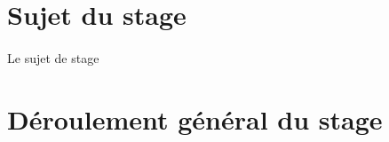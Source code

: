 \section*{Sujet du stage}
\paragraph{}
Le sujet de stage 

\paragraph{}

\paragraph{}

\paragraph{}
\subparagraph{}
\subparagraph{}
\subparagraph{}

\paragraph{}
\paragraph{}
 
\section*{Déroulement général du stage}
\paragraph{}
\paragraph{}
